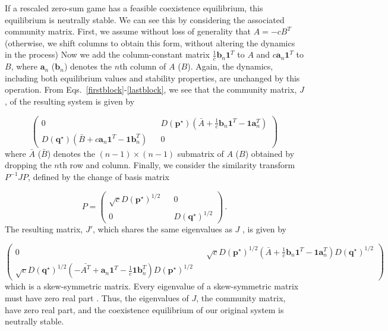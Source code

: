 \documentclass[11pt]{article}
\begin{document}
If a rescaled zero-sum game has a feasible coexistence equilibrium, this equilibrium is neutrally stable. We can see this by considering the associated community matrix. First, we assume without loss of generality that $A = -c B^T$ (otherwise, we shift columns to obtain this form, without altering the dynamics in the process) Now we add the column-constant matrix $\frac{1}{c} \bm{b}_n \bm{1}^T$ to $A$ and $c \bm{a}_n \bm{1}^T$ to $B$, where $\bm{a}_n$ ($\bm{b}_n$) denotes the $n$th column of $A$ ($B$). Again, the dynamics, including both equilibrium values and stability properties, are unchanged by this operation. From Eqs.~\ref{firstblock}-\ref{lastblock}, we see that the community matrix, $J$, of the resulting system is given by

\begin{equation}
\begin{pmatrix}
	0 && D(\bm{p}^\star) (\bar{A} + \frac{1}{c} \bm{b}_n \bm{1}^T - \bm{1} \bm{a}_n^T) \\
	D(\bm{q}^\star) (\bar{B} + c \bm{a}_n \bm{1}^T - \bm{1} \bm{b}_n^T) && 0
\end{pmatrix}
\end{equation}
where $\bar{A}$ ($\bar{B}$) denotes the $(n-1) \times (n-1)$ submatrix of $A$ ($B$) obtained by dropping the $n$th row and column. Finally, we consider the similarity transform $P^{-1} J P$, defined by the change of basis matrix 

\begin{equation}
P = \begin{pmatrix}
	\sqrt{c} D(\bm{p}^\star)^{1/2} && 0 \\
	0 && D(\bm{q}^\star)^{1/2}
\end{pmatrix} \, .
\end{equation}
The resulting matrix, $J'$, which shares the same eigenvalues as $J$ \cite{horn2012matrix}, is given by

\begin{equation}
\begin{pmatrix}
0 && \sqrt{c} D(\bm{p}^\star)^{1/2} (\bar{A} + \frac{1}{c} \bm{b}_n \bm{1}^T - \bm{1} \bm{a}_n^T) D(\bm{q}^\star)^{1/2} \\
\sqrt{c} D(\bm{q}^\star)^{1/2} (-\bar{A^T} + \bm{a}_n \bm{1}^T - \frac{1}{c} \bm{1} \bm{b}_n^T) D(\bm{p}^\star)^{1/2} 
\end{pmatrix}
\end{equation}
which is a skew-symmetric matrix. Every eigenvalue of a skew-symmetric matrix must have zero real part \cite{horn2012matrix}. Thus, the eigenvalues of $J$, the community matrix, have zero real part, and the coexistence equilibrium of our original system is neutrally stable. 
\end{document}
